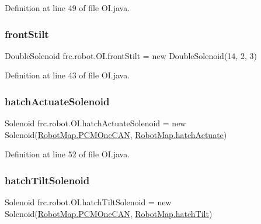 Definition at line 49 of file O\+I.\+java.

\mbox{\label{classfrc_1_1robot_1_1OI_a4f6b2dd823bad92cfaf2e9ecc7c0b1ca}} 
\subsubsection{\texorpdfstring{front\+Stilt}{frontStilt}}
{\footnotesize\ttfamily Double\+Solenoid frc.\+robot.\+O\+I.\+front\+Stilt = new Double\+Solenoid(14, 2, 3)\hspace{0.3cm}{\ttfamily [static]}}



Definition at line 43 of file O\+I.\+java.

\mbox{\label{classfrc_1_1robot_1_1OI_a232ad4f80d75cd3d48c2067251c59817}} 
\subsubsection{\texorpdfstring{hatch\+Actuate\+Solenoid}{hatchActuateSolenoid}}
{\footnotesize\ttfamily Solenoid frc.\+robot.\+O\+I.\+hatch\+Actuate\+Solenoid = new Solenoid(\hyperlink{classfrc_1_1robot_1_1RobotMap_a79a848df56d706c787d9a4f9a0434e7f}{Robot\+Map.\+P\+C\+M\+One\+C\+AN}, \hyperlink{classfrc_1_1robot_1_1RobotMap_a7bec1963c7590911eb30697b0707d9b4}{Robot\+Map.\+hatch\+Actuate})\hspace{0.3cm}{\ttfamily [static]}}



Definition at line 52 of file O\+I.\+java.

\mbox{\label{classfrc_1_1robot_1_1OI_aa8cdb6b236dfb9fead12621b4f42c274}} 
\subsubsection{\texorpdfstring{hatch\+Tilt\+Solenoid}{hatchTiltSolenoid}}
{\footnotesize\ttfamily Solenoid frc.\+robot.\+O\+I.\+hatch\+Tilt\+Solenoid = new Solenoid(\hyperlink{classfrc_1_1robot_1_1RobotMap_a79a848df56d706c787d9a4f9a0434e7f}{Robot\+Map.\+P\+C\+M\+One\+C\+AN}, \hyperlink{classfrc_1_1robot_1_1RobotMap_a0c656cb43ea0fd37d6b94991e8473bf9}{Robot\+Map.\+hatch\+Tilt})\hspace{0.3cm}{\ttfamily [static]}}



